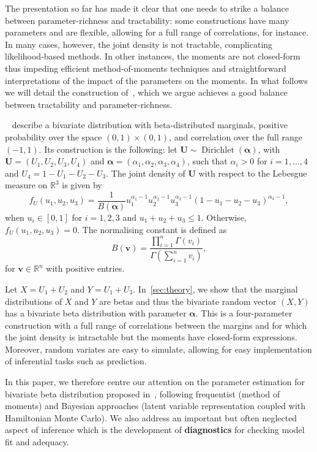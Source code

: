 \documentclass[a4paper, notitlepage, 10pt]{article}
\newcommand{\R}{\mathbb{R}}
\theoremstyle{definition}
\begin{document}
The presentation so far has made it clear that one needs to strike a balance between parameter-richness and tractability: some constructions have many parameters and are flexible, allowing for a full range of correlations, for instance.
In many cases, however, the joint density is not tractable, complicating likelihood-based methods.
In other instances, the moments are not closed-form thus impeding efficient method-of-moments techniques and straightforward interpretations of the impact of the parameters on the moments.
In what follows we will detail the construction of~\cite{olkin2015constructions}, which we argue achieves a good balance between tractability and parameter-richness.

~\cite{olkin2015constructions} describe a bivariate distribution with beta-distributed marginals, positive probability over the space $(0,1) \times (0,1)$, and correlation over the full range $(-1,1)$.
Its construction is the following: let $\boldsymbol{U} \sim \operatorname{Dirichlet}(\boldsymbol{\alpha})$, with $\boldsymbol{U} = (U_1, U_2, U_3, U_4)$ and $\boldsymbol{\alpha} = (\alpha_1, \alpha_2, \alpha_3, \alpha_4)$, such that $\alpha_i > 0$ for $i = 1,\dots,4$ and $U_4 = 1 - U_1 - U_2 - U_3$. 
The joint density of $\boldsymbol{U}$ with respect to the Lebesgue measure on $\R^3$ is given by
\begin{equation}
  \label{eq:dirichlet-distribution}
  f_U(u_1, u_2, u_3) = \frac{1}{B(\boldsymbol{\alpha})}u_1^{\alpha_1-1}u_2^{\alpha_2-1}u_3^{\alpha_3-1}{(1-u_1-u_2-u_3)}^{\alpha_4-1} , 
\end{equation}
when $u_i \in [0,1]$ for $i = 1,2,3$ and $u_1 + u_2 + u_3 \le 1$.
Otherwise, $f_U(u_1, u_2, u_3) = 0$.
The normalising constant is defined as
\[
B(\boldsymbol{v}) = \frac{\prod_{i=1}^n \Gamma(v_i)}{\Gamma\left(\sum_{i=1}^n v_i\right)},
\]
for $\boldsymbol{v} \in \R^n$ with positive entries.

Let $X = U_1 + U_2$ and $Y = U_1 + U_3$.
In~\autoref{sec:theory}, we show that the marginal distributions of $X$ and $Y$ are betas and thus the bivariate random vector $(X, Y)$ has a bivariate beta distribution with parameter $\boldsymbol{\alpha}$.
This is a four-parameter construction with a full range of correlations between the margins and for which the joint density is intractable but the moments have closed-form expressions.
Moreover, random variates are easy to simulate, allowing for easy implementation of inferential tasks such as prediction.

In this paper, we therefore centre our attention on the parameter estimation for bivariate beta distribution proposed in~\cite{olkin2015constructions}, following frequentist (method of moments) and Bayesian approaches (latent variable representation coupled with Hamiltonian Monte Carlo).
We also address an important but often neglected aspect of inference which is the development of \textbf{diagnostics} for checking model fit and adequacy.
\end{document}
